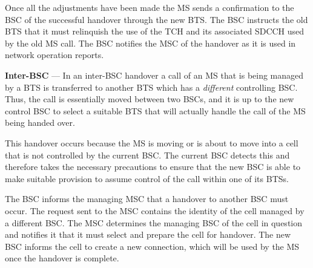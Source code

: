 \begin{description}
Once all the adjustments have been made the \gls{MS} sends a confirmation to the \gls{BSC} of the successful handover through the new \gls{BTS}\@. The \gls{BSC} instructs the old \gls{BTS} that it must relinquish the use of the \gls{TCH} and its associated \gls{SDCCH} used by the old \gls{MS} call. The \gls{BSC} notifies the \gls{MSC} of the handover as it is used in network operation reports\cite{wirelesstelcoMullet,GSMArchitectureProtocolsServices}.
\item{\textbf{Inter-BSC}} --- In an inter-\gls{BSC} handover a call of an \gls{MS} that is being managed by a \gls{BTS} is transferred to another \gls{BTS} which has a \emph{different} controlling \gls{BSC}\@. Thus, the call is essentially moved between two \glspl{BSC}, and it is up to the new control \gls{BSC} to select a suitable \gls{BTS} that will actually handle the call of the \gls{MS} being handed over\cite{wirelesstelcoMullet,GSMArchitectureProtocolsServices}.

  This handover occurs because the \gls{MS} is moving or is about to move into a cell that is not controlled by the current \gls{BSC}\@. The current \gls{BSC} detects this and therefore takes the necessary precautions to ensure that the new \gls{BSC} is able to make suitable provision to assume control of the call within one of its BTSs\cite{wirelesstelcoMullet,GSMArchitectureProtocolsServices}.

The \gls{BSC} informs the managing \gls{MSC} that a handover to another \gls{BSC} must occur. The request sent to the \gls{MSC} contains the identity of the cell managed by a different BSC\@. The \gls{MSC} determines the managing \gls{BSC} of the cell in question and notifies it that it must select and prepare the cell for handover. The new \gls{BSC} informs the cell to create a new connection, which will be used by the \gls{MS} once the handover is complete\cite{wirelesstelcoMullet,GSMArchitectureProtocolsServices}.


\end{description}
